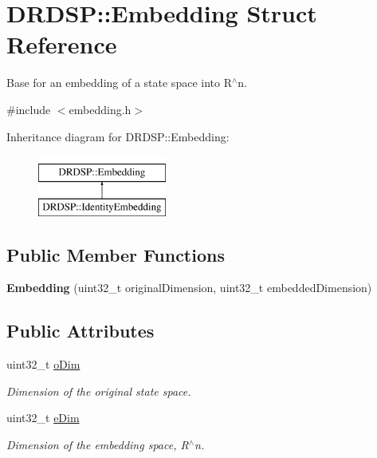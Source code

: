 \hypertarget{struct_d_r_d_s_p_1_1_embedding}{\section{D\-R\-D\-S\-P\-:\-:Embedding Struct Reference}
\label{struct_d_r_d_s_p_1_1_embedding}
}


Base for an embedding of a state space into R$^\wedge$n.  




{\ttfamily \#include $<$embedding.\-h$>$}

Inheritance diagram for D\-R\-D\-S\-P\-:\-:Embedding\-:\begin{figure}[H]
\begin{center}
\leavevmode
\includegraphics[height=2.000000cm]{struct_d_r_d_s_p_1_1_embedding}
\end{center}
\end{figure}
\subsection*{Public Member Functions}
\begin{DoxyCompactItemize}
\item 
\hypertarget{struct_d_r_d_s_p_1_1_embedding_a03a9777076d129e3330a7c69e3ff48e3}{{\bfseries Embedding} (uint32\-\_\-t original\-Dimension, uint32\-\_\-t embedded\-Dimension)}\label{struct_d_r_d_s_p_1_1_embedding_a03a9777076d129e3330a7c69e3ff48e3}

\end{DoxyCompactItemize}
\subsection*{Public Attributes}
\begin{DoxyCompactItemize}
\item 
\hypertarget{struct_d_r_d_s_p_1_1_embedding_ac49e8aa042fbf2ee8e9fdc3d2b4f1c26}{uint32\-\_\-t \hyperlink{struct_d_r_d_s_p_1_1_embedding_ac49e8aa042fbf2ee8e9fdc3d2b4f1c26}{o\-Dim}}\label{struct_d_r_d_s_p_1_1_embedding_ac49e8aa042fbf2ee8e9fdc3d2b4f1c26}

\begin{DoxyCompactList}\small\item\em Dimension of the original state space. \end{DoxyCompactList}\item 
\hypertarget{struct_d_r_d_s_p_1_1_embedding_aa49b8deb5d403025ca5db3f483c015b2}{uint32\-\_\-t \hyperlink{struct_d_r_d_s_p_1_1_embedding_aa49b8deb5d403025ca5db3f483c015b2}{e\-Dim}}\label{struct_d_r_d_s_p_1_1_embedding_aa49b8deb5d403025ca5db3f483c015b2}

\begin{DoxyCompactList}\small\item\em Dimension of the embedding space, R$^\wedge$n. \end{DoxyCompactList}\end{DoxyCompactItemize}



